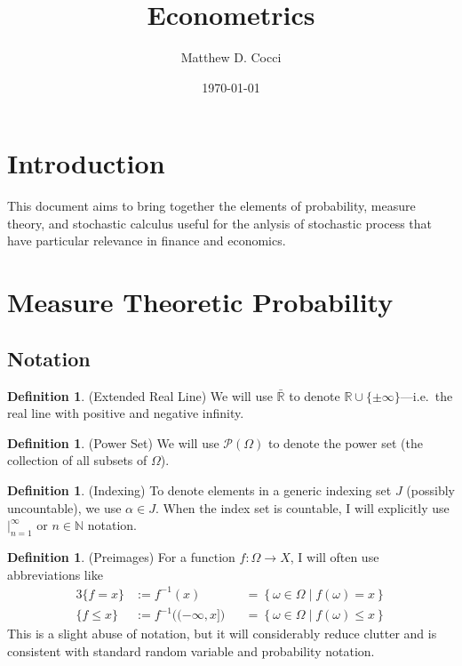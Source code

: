 \documentclass[12pt]{article}
\author{Matthew D. Cocci}
\title{Econometrics}
\date{\today}
\theoremstyle{plain}
\theoremstyle{definition}
\newtheorem{defn}[thm]{Definition}
\theoremstyle{remark}
\newcommand{\ra}{\rightarrow}
\newcommand{\sP}{\mathscr{P}}
\newcommand{\R}{\mathbb{R}}
\newcommand{\N}{\mathbb{N}}
\begin{document}
\maketitle
\tableofcontents %

\clearpage

\section{Introduction}

This document aims to bring together the elements of probability,
measure theory, and stochastic calculus useful for the anlysis of
stochastic process that have particular relevance in finance and
economics.


\section{Measure Theoretic Probability}

\subsection{Notation}


\begin{defn}(Extended Real Line)
We will use $\bar{\R}$ to denote $\R \cup \{\pm \infty\}$---i.e.\ the
real line with positive and negative infinity.
\end{defn}

\begin{defn}(Power Set)
We will use $\sP(\Omega)$ to denote the power set (the collection of all
subsets of $\Omega$).
\end{defn}

\begin{defn}(Indexing)
To denote elements in a generic indexing set $J$ (possibly uncountable),
we use $\alpha \in J$. When the index set is countable, I will
explicitly use $|_{n=1}^\infty$ or $n\in\N$ notation.
\end{defn}

\begin{defn}(Preimages)
For a function $f:\Omega\ra X$, I will often use abbreviations like
\begin{alignat*}{3}
  \{f=x\} &:= f^{-1}(x)
  &&= \left\{ \omega\in\Omega \;|\; f(\omega)= x\right\} \\
  \{f \leq x\} &:= f^{-1}\big((-\infty,x]\big)
  &&= \left\{ \omega\in\Omega \;|\; f(\omega)\leq x \right\}
\end{alignat*}
This is a slight abuse of notation, but it will considerably reduce
clutter and is consistent with standard random variable and probability
notation.
\end{defn}
\end{document}
